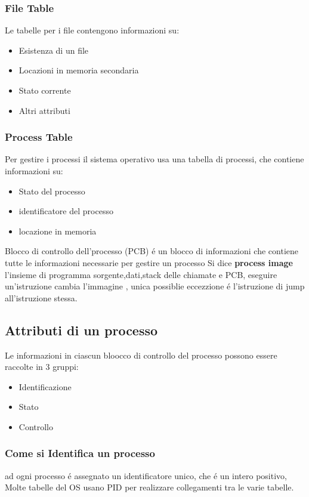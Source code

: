 \subsubsection{File Table}
Le tabelle per i file contengono informazioni su:
\begin{itemize}
    \item Esistenza di un file
    \item Locazioni in memoria secondaria
    \item Stato corrente
    \item Altri attributi
\end{itemize}
\subsubsection{Process Table}
Per gestire i processi il sistema operativo usa una tabella di processi, che contiene informazioni su:
\begin{itemize}
    \item Stato del processo
    \item identificatore del processo
    \item locazione in memoria
\end{itemize}
Blocco di controllo dell'processo (PCB) é un blocco di informazioni che contiene tutte le informazioni necessarie per gestire un processo
\newline
Si dice \textbf{process image} l'insieme di programma sorgente,dati,stack delle chiamate e PCB, eseguire un'istruzione cambia l'immagine
, unica possiblie eccezzione é l'istruzione di jump all'istruzione stessa.
\subsection{Attributi di un processo}
Le informazioni in ciascun bloocco di controllo del processo possono essere raccolte in 3 gruppi:
\begin{itemize}
    \item Identificazione
    \item Stato
    \item Controllo
\end{itemize}
\subsubsection{Come si Identifica un processo}
ad ogni processo é assegnato un identificatore unico, che é un intero positivo, Molte tabelle del OS usano PID
per realizzare collegamenti tra le varie tabelle.
